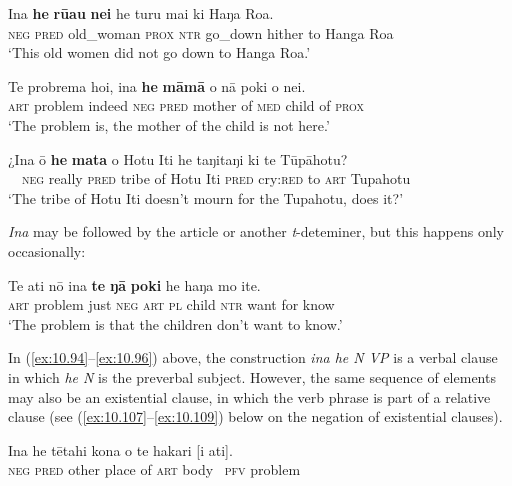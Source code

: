 \ea\label{ex:10.94}
\gll {\ꞌ}Ina \textbf{he} \textbf{rū{\ꞌ}au} \textbf{nei} he turu mai ki Haŋa Roa. \\
\textsc{neg} \textsc{pred} old\_woman \textsc{prox} \textsc{ntr} go\_down hither to Hanga Roa \\

\glt 
‘This old women did not go down to Hanga Roa.’ \textstyleExampleref{[R380.006]} 
\z

\ea\label{ex:10.95}
\gll Te probrema ho{\ꞌ}i, {\ꞌ}ina \textbf{he} \textbf{māmā} o nā poki o nei. \\
\textsc{art} problem indeed \textsc{neg} \textsc{pred} mother of \textsc{med} child of \textsc{prox} \\

\glt 
‘The problem is, the mother of the child is not here.’ \textstyleExampleref{[R403.051]} 
\z

\ea\label{ex:10.96}
\gll ¿{\ꞌ}Ina {\ꞌ}ō \textbf{he} \textbf{mata} o Hotu {\ꞌ}Iti he taŋitaŋi ki te Tūpāhotu?\\
~~\textsc{neg} really \textsc{pred} tribe of Hotu Iti \textsc{pred} cry:\textsc{red} to \textsc{art} Tupahotu\\

\glt
‘The tribe of Hotu Iti doesn’t mourn for the Tupahotu, does it?’ \textstyleExampleref{[R304.070]} 
\z

\textit{{\ꞌ}Ina} may be followed by the article or another \textit{t}{}-deteminer, but this happens only occasionally:

\ea\label{ex:10.97}
\gll Te {\ꞌ}ati nō {\ꞌ}ina \textbf{te} \textbf{ŋā} \textbf{poki} he haŋa mo {\ꞌ}ite. \\
\textsc{art} problem just \textsc{neg} \textsc{art} \textsc{pl} child \textsc{ntr} want for know \\

\glt 
‘The problem is that the children don’t want to know.’ \textstyleExampleref{[R647.094]} 
\z

In (\ref{ex:10.94}–\ref{ex:10.96}) above, the construction \textit{{\ꞌ}ina he N VP} is a verbal clause in which \textit{he N} is the preverbal subject. However, the same sequence of elements may also be an existential clause, in which the verb phrase is part of a relative clause (see (\ref{ex:10.107}–\ref{ex:10.109}) below on the negation of existential clauses). 

\ea\label{ex:10.98}
\gll {\ꞌ}Ina he tētahi kona o te hakari [i {\ꞌ}ati]. \\
\textsc{neg} \textsc{pred} other place of \textsc{art} body ~\textsc{pfv} problem \\


